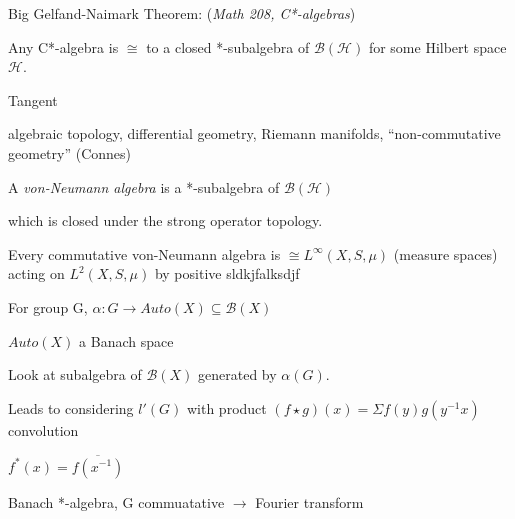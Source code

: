 \documentclass[12pt]{article}
\begin{document}
\noindent
Big Gelfand-Naimark Theorem: (\textit{Math 208, C*-algebras})

Any C*-algebra is $\cong$ to a closed *-subalgebra of $\mathscr{B}(\mathscr{H})$ for some Hilbert space $\mathscr{H}$.

\noindent
Tangent

algebraic topology, differential geometry, Riemann manifolds, ``non-commutative geometry'' (Connes)

\noindent
A \textit{von-Neumann algebra} is a *-subalgebra of $\mathscr{B}(\mathscr{H})$

which is closed under the strong operator topology.

Every commutative von-Neumann algebra is $\cong L^\infty(X, S, \mu)$ (measure spaces) acting on $L^2(X, S, \mu)$ by positive sldkjfalksdjf

\noindent
For group G, $\alpha: G \to Auto(X) \subseteq \mathscr{B}(X)$

$Auto(X)$ a Banach space

Look at subalgebra of $\mathscr{B}(X)$ generated by $\alpha(G)$.

Leads to considering $l'(G)$ with product $(f \star g)(x) = \Sigma f(y)g(y^{-1}x)$ convolution

$f^*(x) = \overline{f(x^{-1})}$

Banach *-algebra, G commuatative $\to$ Fourier transform
\end{document}
